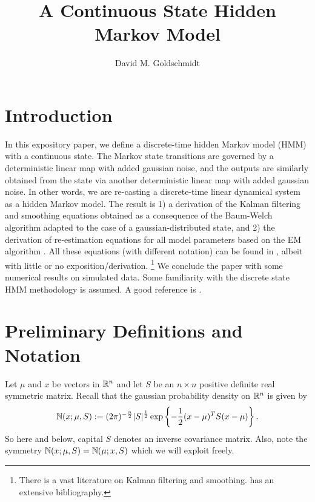 \documentclass[12pt,leqno]{article}
\title{A Continuous State Hidden Markov Model}
\author{David M. Goldschmidt}
\begin{document}
\newcommand{\p}{\ensuremath{u}}
\newcommand{\VV}{V}
\maketitle


\section{Introduction}
In this expository paper, we define a discrete-time hidden Markov model (HMM) with a continuous state.
The Markov state transitions
are governed by a deterministic linear map with added gaussian noise, and the outputs are similarly obtained from the
state via another deterministic linear map with added gaussian noise.  In other words, we are re-casting a discrete-time
linear dynamical system as a hidden Markov model.  The result is 1) a derivation of the Kalman filtering and smoothing
equations \cite{Aravkin} obtained as a consequence of the Baum-Welch algorithm \cite{Bilmes} adapted to the case of a
gaussian-distributed state, and 2) the derivation of re-estimation equations for all model parameters based on the EM algorithm
\cite{Dempster}.  All these equations (with different notation) can be found in \cite{Hinton}, albeit with little or no
exposition/derivation.  \footnote{There is a vast literature on Kalman filtering and smoothing.  \cite{Aravkin} has an extensive bibliography.}
We conclude the paper with some numerical results on simulated data.
Some familiarity with the discrete state HMM methodology is assumed.  A good reference is \cite{Bilmes}. 

\section{Preliminary Definitions and Notation}
Let $\mu$ and $x$ be vectors in ${\mathbb R}^n$ and let $S$ be an $n\times{n}$ positive
definite real symmetric matrix.  Recall that the gaussian probability density
on ${\mathbb R}^n$ is given by 
$$
{\mathbb N}(x;\mu,S) := (2\pi)^{-\frac{n}{2}}|S|^{\frac{1}{2}}\exp\left\{-\frac{1}{2}
(x - \mu)^TS(x-\mu)\right\}.
$$
So here and below, capital $S$ denotes an inverse covariance matrix. Also, note the symmetry ${\mathbb N}(x;\mu,S) = {\mathbb N}(\mu;x,S)$
which we will exploit freely.
\end{document}
